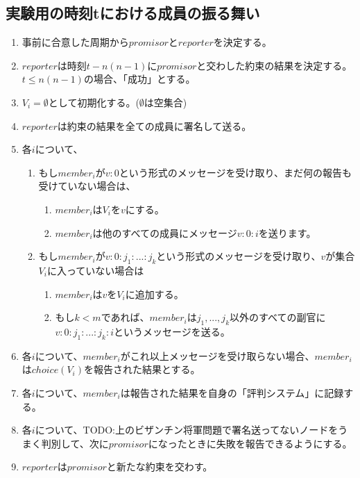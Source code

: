   \subsection{実験用の時刻tにおける成員の振る舞い}
  \begin{enumerate}
    \item 事前に合意した周期から$promisor$と$reporter$を決定する。
    \item $reporter$は時刻$t-n(n-1)$に$promisor$と交わした約束の結果を決定する。$t \leq n(n-1)$の場合、「成功」とする。
    \item $V_i=\emptyset$として初期化する。($\emptyset$は空集合)
    \item $reporter$は約束の結果を全ての成員に署名して送る。
    \item 各$i$について、 
    \begin{enumerate}
      \item もし$member_i$が$v:0$という形式のメッセージを受け取り、まだ何の報告も受けていない場合は、
      \begin{enumerate}
        \item $member_i$は$ V_i$を${v}$にする。 
        \item $member_i$は他のすべての成員にメッセージ$v:0:i$を送ります。
      \end{enumerate}
      \item もし$member_i$が$v:0:j_1:...:j_k$という形式のメッセージを受け取り、$v$が集合$V_i$に入っていない場合は
      \begin{enumerate}
        \item $member_i$は$v$を$V_i$に追加する。
        \item もし$k<m$であれば、$member_i$は$j_1, ..., j_k$以外のすべての副官に$v:0:j_1:...:j_k:i$というメッセージを送る。
      \end{enumerate}
    \end{enumerate}
    \item 各$i$について、$member_i$がこれ以上メッセージを受け取らない場合、$member_i$は$choice(V_i)$を報告された結果とする。
    \item 各$i$について、$member_i$は報告された結果を自身の「評判システム」に記録する。
    \item 各$i$について、TODO:上のビザンチン将軍問題で署名送ってないノードをうまく判別して、次に$promisor$になったときに失敗を報告できるようにする。
    \item $reporter$は$promisor$と新たな約束を交わす。
  \end{enumerate}
  
